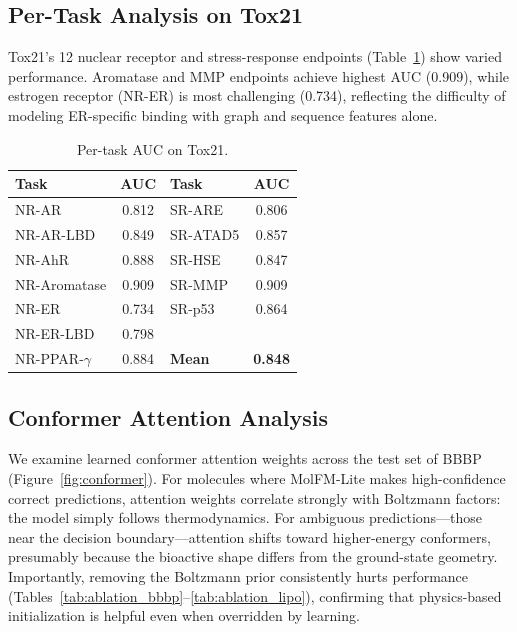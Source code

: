 \documentclass[11pt]{article}
\newcommand{\modelname}{MolFM-Lite}
\begin{document}
\subsection{Per-Task Analysis on Tox21}

Tox21's 12 nuclear receptor and stress-response endpoints (Table~\ref{tab:tox21}) show varied performance. Aromatase and MMP endpoints achieve highest AUC (0.909), while estrogen receptor (NR-ER) is most challenging (0.734), reflecting the difficulty of modeling ER-specific binding with graph and sequence features alone.

\begin{table}[t]
    \centering
    \caption{Per-task AUC on Tox21.}
    \label{tab:tox21}
    \small
    \begin{tabular}{lc|lc}
        \toprule
        \textbf{Task} & \textbf{AUC} & \textbf{Task} & \textbf{AUC} \\
        \midrule
        NR-AR & 0.812 & SR-ARE & 0.806 \\
        NR-AR-LBD & 0.849 & SR-ATAD5 & 0.857 \\
        NR-AhR & 0.888 & SR-HSE & 0.847 \\
        NR-Aromatase & 0.909 & SR-MMP & 0.909 \\
        NR-ER & 0.734 & SR-p53 & 0.864 \\
        NR-ER-LBD & 0.798 & & \\
        NR-PPAR-$\gamma$ & 0.884 & \textbf{Mean} & \textbf{0.848} \\
        \bottomrule
    \end{tabular}
\end{table}

\subsection{Conformer Attention Analysis}
\label{sec:conformer_analysis}

We examine learned conformer attention weights across the test set of BBBP (Figure~\ref{fig:conformer}). For molecules where \modelname{} makes high-confidence correct predictions, attention weights correlate strongly with Boltzmann factors: the model simply follows thermodynamics. For ambiguous predictions---those near the decision boundary---attention shifts toward higher-energy conformers, presumably because the bioactive shape differs from the ground-state geometry. Importantly, removing the Boltzmann prior consistently hurts performance (Tables~\ref{tab:ablation_bbbp}--\ref{tab:ablation_lipo}), confirming that physics-based initialization is helpful even when overridden by learning.
\end{document}
